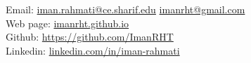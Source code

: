 { %
\noindent
Email: \href{mailto:iman.rahmati@ce.sharif.edu}{iman.rahmati@ce.sharif.edu} \space \href{mailto:imanrht@gmail.com}{imanrht@gmail.com} \\
Web page: \href{https://imanrht.github.io}{imanrht.github.io} \\
Github: \href{https://github.com/ImanRHT}{https://github.com/ImanRHT}\\
Linkedin: \href{https://linkedin.com/in/iman-rahmati}{linkedin.com/in/iman-rahmati}\\
}
